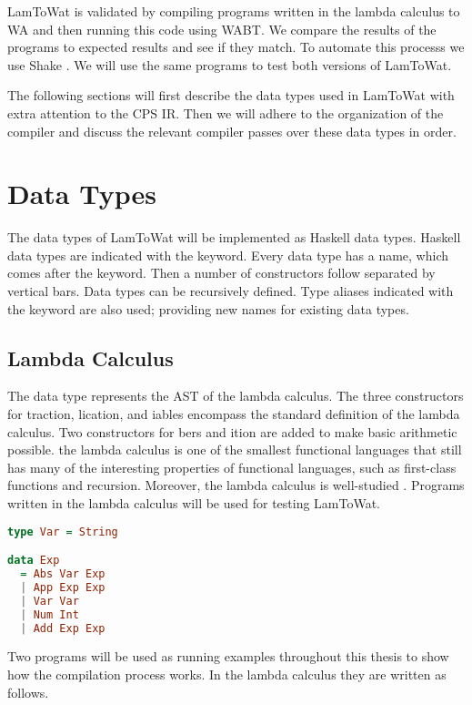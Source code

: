 LamToWat is validated by compiling programs written in the lambda calculus to \ac{WA} and then running this code using \ac{WABT}. We compare the results of the programs to expected results and see if they match. To automate this processs we use Shake \autocite{shake}. We will use the same programs to test both versions of LamToWat.

The following sections will first describe the data types used in LamToWat with extra attention to the \ac{CPS} \ac{IR}. Then we will adhere to the organization of the compiler and discuss the relevant compiler passes over these data types in order.

\section{\label{section:datatypes}Data Types}
The data types of LamToWat will be implemented as Haskell data types. Haskell data types are indicated with the  keyword. Every data type has a name, which comes after the keyword. Then a number of constructors follow separated by vertical bars. Data types can be recursively defined. Type aliases indicated with the  keyword are also used; providing new names for existing data types.

\subsection{\label{subsection:expdata}Lambda Calculus}
The  data type represents the \ac{AST} of the lambda calculus. The three constructors for traction, lication, and iables encompass the standard definition of the lambda calculus. Two constructors for bers and ition are added to make basic arithmetic possible. the lambda calculus is one of the smallest functional languages that still has many of the interesting properties of functional languages, such as first-class functions and recursion. Moreover, the lambda calculus is well-studied \autocite{barendregt1984lambda}. Programs written in the lambda calculus will be used for testing LamToWat.

\begin{lstlisting}[language=Haskell]
type Var = String

data Exp
  = Abs Var Exp
  | App Exp Exp
  | Var Var
  | Num Int
  | Add Exp Exp
\end{lstlisting}

Two programs will be used as running examples throughout this thesis to show how the compilation process works. In the lambda calculus they are written as follows.

